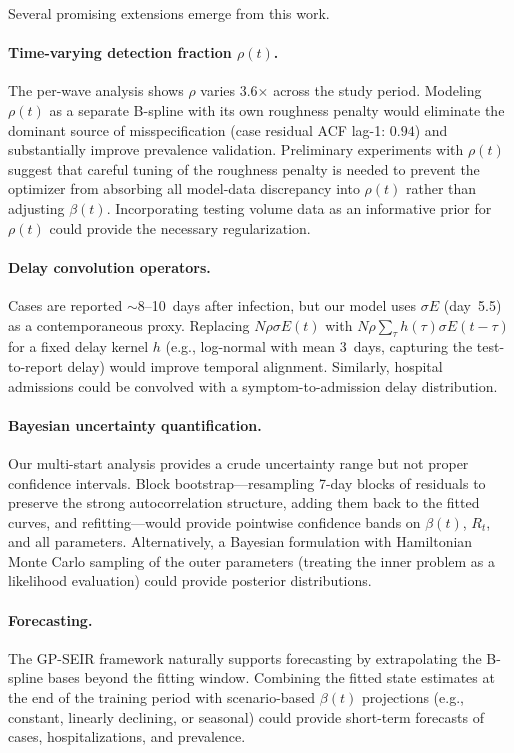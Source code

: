 \documentclass[11pt]{article}
\begin{document}
Several promising extensions emerge from this work.

\paragraph{Time-varying detection fraction $\rho(t)$.} The per-wave analysis shows $\hat\rho$ varies 3.6$\times$ across the study period. Modeling $\rho(t)$ as a separate B-spline with its own roughness penalty would eliminate the dominant source of misspecification (case residual ACF lag-1: $0.94$) and substantially improve prevalence validation. Preliminary experiments with $\rho(t)$ suggest that careful tuning of the roughness penalty is needed to prevent the optimizer from absorbing all model-data discrepancy into $\rho(t)$ rather than adjusting $\beta(t)$. Incorporating testing volume data as an informative prior for $\rho(t)$ could provide the necessary regularization.

\paragraph{Delay convolution operators.} Cases are reported $\sim$8--10~days after infection, but our model uses $\sigma E$ (day~5.5) as a contemporaneous proxy. Replacing $N\rho\sigma E(t)$ with $N\rho \sum_\tau h(\tau)\sigma E(t-\tau)$ for a fixed delay kernel $h$ (e.g., log-normal with mean 3~days, capturing the test-to-report delay) would improve temporal alignment. Similarly, hospital admissions could be convolved with a symptom-to-admission delay distribution.

\paragraph{Bayesian uncertainty quantification.} Our multi-start analysis provides a crude uncertainty range but not proper confidence intervals. Block bootstrap---resampling 7-day blocks of residuals to preserve the strong autocorrelation structure, adding them back to the fitted curves, and refitting---would provide pointwise confidence bands on $\beta(t)$, $R_t$, and all parameters. Alternatively, a Bayesian formulation with Hamiltonian Monte Carlo sampling of the outer parameters (treating the inner problem as a likelihood evaluation) could provide posterior distributions.

\paragraph{Forecasting.} The GP-SEIR framework naturally supports forecasting by extrapolating the B-spline bases beyond the fitting window. Combining the fitted state estimates at the end of the training period with scenario-based $\beta(t)$ projections (e.g., constant, linearly declining, or seasonal) could provide short-term forecasts of cases, hospitalizations, and prevalence.
\end{document}
